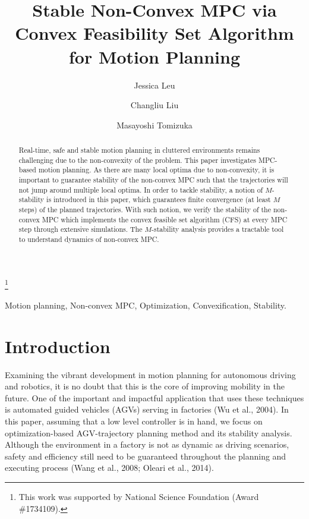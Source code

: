 \documentclass{ifacconf}
\begin{document}
\begin{frontmatter}

\title{Stable Non-Convex MPC via Convex Feasibility Set Algorithm for Motion Planning} 

\thanks[footnoteinfo]{This work was supported by National Science Foundation (Award \#1734109).}

\author[First]{ Jessica Leu} 
\author[Second]{ Changliu Liu} 
\author[First]{ Masayoshi Tomizuka}

\address[First]{ University of California,
Berkeley, CA 94720 USA\\ \tt jess.leu24@berkeley.edu, tomizuka@me.berkeley.edu}
\address[Second]{ Stanford University, CA 94305 USA\\ \tt  changliuliu@stanford.edu}


\begin{abstract}                %
Real-time, safe and stable motion planning in cluttered environments remains challenging due to the non-convexity of the problem. This paper investigates MPC-based motion planning. As there are many local optima due to non-convexity, it is important to guarantee stability of the non-convex MPC such that the trajectories will not jump around multiple local optima. In order to tackle stability, a notion of $M$-stability is introduced in this paper, which guarantees finite convergence (at least $M$ steps) of the planned trajectories. With such notion, we verify the stability of the non-convex MPC which implements the convex feasible set algorithm (CFS) at every MPC step through extensive simulations. The $M$-stability analysis provides a tractable tool to understand dynamics of non-convex MPC.
 

\end{abstract}

\begin{keyword}
Motion planning, Non-convex MPC, Optimization, Convexification, Stability.
\end{keyword}

\end{frontmatter}

\section{Introduction}
Examining the vibrant development in motion planning for autonomous driving and robotics, it is no doubt that this is the core of improving mobility in the future. One of the important and impactful application that uses these techniques is automated guided vehicles (AGVs) serving in factories (Wu et al., 2004). In this paper, assuming that a low level controller is in hand, we focus on optimization-based AGV-trajectory planning method and its stability analysis. Although the environment in a factory is not as dynamic as driving scenarios, safety and efficiency still need to be guaranteed throughout the planning and executing process (Wang et al., 2008; Oleari et al., 2014).
\end{document}

